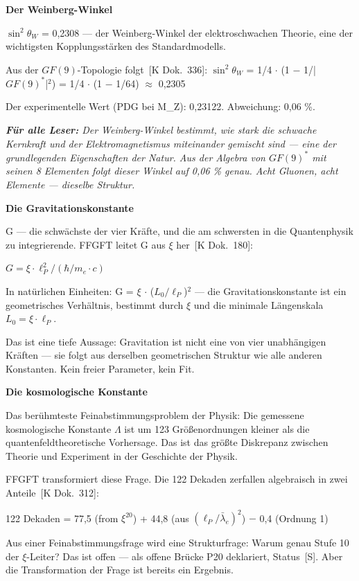 \documentclass[11pt,oneside]{book}
\newcommand{\status}[1]{\penalty10000\,{\scriptsize\textcolor{gray!60}{[#1]}}}
\newenvironment{laierspur}{%
  \par\vspace{4pt}%
  \noindent\small\itshape\color{blue!60!black}%
  \textbf{Für alle Leser:}\enspace\ignorespaces}{%
  \par\vspace{4pt}\normalsize\normalfont\normalcolor}
\begin{document}
\textbf{Der Weinberg-Winkel}


$\sin^2\theta_W$ = 0,2308 — der Weinberg-Winkel der elektroschwachen Theorie,
eine der wichtigsten Kopplungsstärken des Standardmodells.


Aus der $GF(9)$-Topologie folgt \status{K Dok.~336}:
$\sin^2\theta_W$ = 1/4 $\cdot$ (1 $-$ 1/|$GF(9)^*$|$^2$) = 1/4 $\cdot$ (1 $-$ 1/64) $\approx$ 0,2305


Der experimentelle Wert (PDG bei M\_Z): 0,23122. Abweichung: 0,06 \%.


\begin{laierspur}
Der Weinberg-Winkel bestimmt, wie stark die schwache
Kernkraft und der Elektromagnetismus miteinander gemischt sind —
eine der grundlegenden Eigenschaften der Natur. Aus der Algebra
von $GF(9)^*$ mit seinen 8 Elementen folgt dieser Winkel auf
0,06 \% genau. Acht Gluonen, acht Elemente — dieselbe Struktur.
\end{laierspur}

\textbf{Die Gravitationskonstante}


G — die schwächste der vier Kräfte, und die am schwersten in die
Quantenphysik zu integrierende. FFGFT leitet G aus $\xi$ her \status{K Dok.~180}:


$G = \xi \cdot \ell_P^{2} / (\hbar / m_e \cdot c)$


In natürlichen Einheiten: G = $\xi$ $\cdot$ ($L_0/\ell_P$)$^2$ — die Gravitationskonstante
ist ein geometrisches Verhältnis, bestimmt durch $\xi$ und die minimale
Längenskala $L_0 = \xi \cdot \ell_P$.


Das ist eine tiefe Aussage: Gravitation ist nicht eine von vier
unabhängigen Kräften — sie folgt aus derselben geometrischen Struktur
wie alle anderen Konstanten. Kein freier Parameter, kein Fit.


\textbf{Die kosmologische Konstante}


Das berühmteste Feinabstimmungsproblem der Physik: Die gemessene
kosmologische Konstante $\Lambda$ ist um 123 Größenordnungen kleiner als die
quantenfeldtheoretische Vorhersage. Das ist das größte Diskrepanz
zwischen Theorie und Experiment in der Geschichte der Physik.


FFGFT transformiert diese Frage. Die 122 Dekaden zerfallen algebraisch
in zwei Anteile \status{K Dok.~312}:


122 Dekaden = 77,5 (from $\xi^{20}$) + 44,8 (aus $(\ell_P/\bar{\lambda}_e)^2$) $-$ 0,4 (Ordnung 1)


Aus einer Feinabstimmungsfrage wird eine Strukturfrage: Warum genau
Stufe 10 der $\xi$-Leiter? Das ist offen — als offene Brücke P20 deklariert,
Status \status{S}. Aber die Transformation der Frage ist bereits ein Ergebnis.
\end{document}
